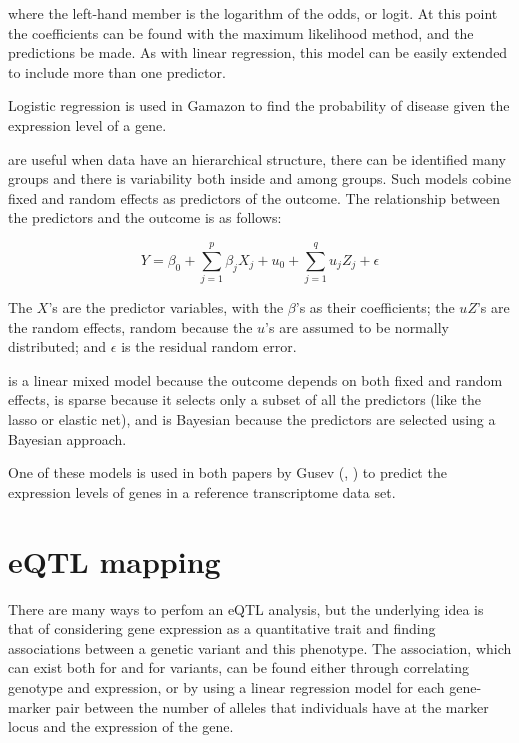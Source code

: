\documentclass[../main.tex]{subfiles}
\begin{document}
where the left-hand member is the logarithm of the odds, or logit. At 
this point the coefficients can be found with the maximum likelihood 
method, and the predictions be made. As with linear regression, this 
model can be easily extended to include more than one predictor.

Logistic regression is used in Gamazon \etal to find the probability of 
disease given the expression level of a gene.

 are useful when data have an 
hierarchical structure, \ie there can be identified many groups and 
there is variability both inside and among groups. Such models cobine 
fixed and random effects as predictors of the outcome. The relationship 
between the predictors and the outcome is as follows:

\begin{equation}
	Y = \beta_0 + \sum_{j=1}^{p} \beta_j X_j +
		u_0 + \sum_{j=1}^{q} u_j Z_j + \epsilon
\end{equation}

The $X$'s are the predictor variables, with the $\beta$'s as their 
coefficients; the $uZ$'s are the random effects, random because the 
$u$'s are assumed to be normally distributed; and $\epsilon$ is the 
residual random error.

 is 
a linear mixed model because the outcome depends on both fixed and 
random effects, is sparse because it selects only a subset of all the 
predictors (like the lasso or elastic net), and is Bayesian because the 
predictors are selected using a Bayesian approach.

One of these models is used in both papers by Gusev \etal 
(, ) to predict the expression levels 
of genes in a reference transcriptome data set.

\section{eQTL mapping}

There are many ways to perfom an eQTL analysis\autocite{Gilad2008}, but the 
underlying idea is that of considering gene expression as a quantitative 
trait and finding associations between a genetic variant and this 
phenotype. The association, which can exist both for \cis and for \trans 
variants, can be found either through correlating genotype and 
expression, or by using a linear regression model for each gene-marker 
pair between the number of alleles that individuals have at the marker 
locus and the expression of the gene.
\end{document}
